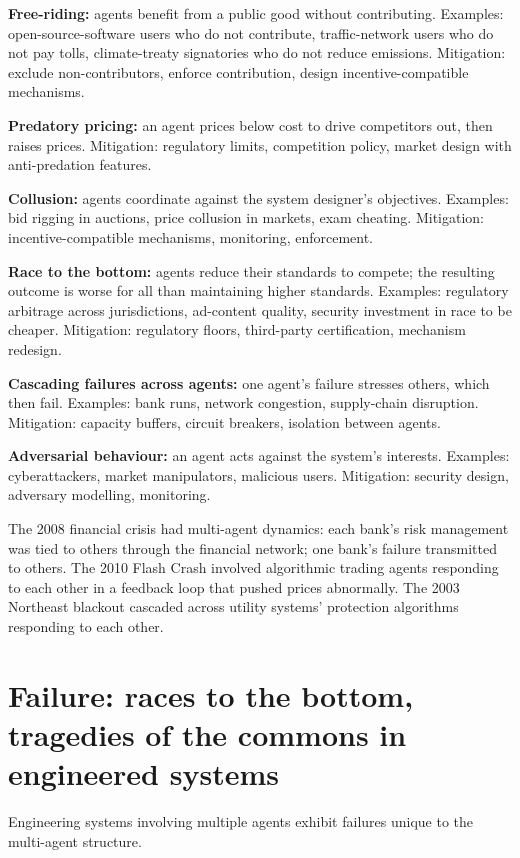 \textbf{Free-riding:} agents benefit from a public good without contributing. Examples: open-source-software users who do not contribute, traffic-network users who do not pay tolls, climate-treaty signatories who do not reduce emissions. Mitigation: exclude non-contributors, enforce contribution, design incentive-compatible mechanisms.

\textbf{Predatory pricing:} an agent prices below cost to drive competitors out, then raises prices. Mitigation: regulatory limits, competition policy, market design with anti-predation features.

\textbf{Collusion:} agents coordinate against the system designer's objectives. Examples: bid rigging in auctions, price collusion in markets, exam cheating. Mitigation: incentive-compatible mechanisms, monitoring, enforcement.

\textbf{Race to the bottom:} agents reduce their standards to compete; the resulting outcome is worse for all than maintaining higher standards. Examples: regulatory arbitrage across jurisdictions, ad-content quality, security investment in race to be cheaper. Mitigation: regulatory floors, third-party certification, mechanism redesign.

\textbf{Cascading failures across agents:} one agent's failure stresses others, which then fail. Examples: bank runs, network congestion, supply-chain disruption. Mitigation: capacity buffers, circuit breakers, isolation between agents.

\textbf{Adversarial behaviour:} an agent acts against the system's interests. Examples: cyberattackers, market manipulators, malicious users. Mitigation: security design, adversary modelling, monitoring.

The 2008 financial crisis had multi-agent dynamics: each bank's risk management was tied to others through the financial network; one bank's failure transmitted to others. The 2010 Flash Crash involved algorithmic trading agents responding to each other in a feedback loop that pushed prices abnormally. The 2003 Northeast blackout cascaded across utility systems' protection algorithms responding to each other.

\section{Failure: races to the bottom, tragedies of the commons in engineered systems}

Engineering systems involving multiple agents exhibit failures unique to the multi-agent structure.

